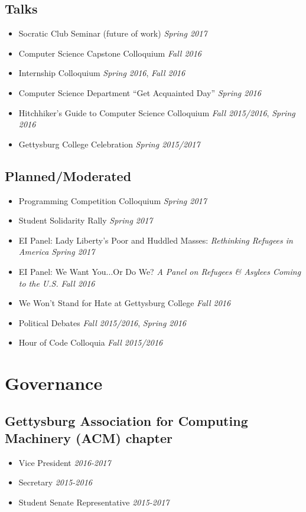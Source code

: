 \documentclass[11pt]{article}
\begin{document}
\subsection*{Talks}
\begin{itemize}[noitemsep]
	\item Socratic Club Seminar (future of work) \hfill \textit{Spring 2017}
	\item Computer Science Capstone Colloquium \hfill \textit{Fall 2016}
	\item Internship Colloquium \hfill \textit{Spring 2016}, \textit{Fall 2016}
	\item Computer Science Department ``Get Acquainted Day'' \hfill \textit{Spring 2016}
	\item Hitchhiker's Guide to Computer Science Colloquium \hfill \textit{Fall 2015/2016}, \textit{Spring 2016}
	\item Gettysburg College Celebration \hfill \textit{Spring 2015/2017}
\end{itemize}

\subsection*{Planned/Moderated}
\begin{itemize}[noitemsep]
	\item Programming Competition Colloquium \hfill \textit{Spring 2017}
	\item Student Solidarity Rally \hfill \textit{Spring 2017}
	\item EI Panel: Lady Liberty's Poor and Huddled Masses: \textit{Rethinking Refugees in America} \hfill \textit{Spring 2017}
	\item EI Panel: We Want You...Or Do We? \textit{A Panel on Refugees \& Asylees Coming to the U.S.} \hfill \textit{Fall 2016}
	\item We Won't Stand for Hate at Gettysburg College \hfill \textit{Fall 2016}
	\item Political Debates \hfill \textit{Fall 2015/2016}, \textit{Spring 2016}
	\item Hour of Code Colloquia \hfill \textit{Fall 2015/2016}
\end{itemize}

\section*{Governance}
\subsection*{Gettysburg Association for Computing Machinery (ACM) chapter}
\begin{itemize}[noitemsep]
	\item Vice President \hfill \textit{2016-2017}
	\item Secretary \hfill \textit{2015-2016}
	\item Student Senate Representative \hfill \textit{2015-2017}
\end{itemize}
 
\end{document}
